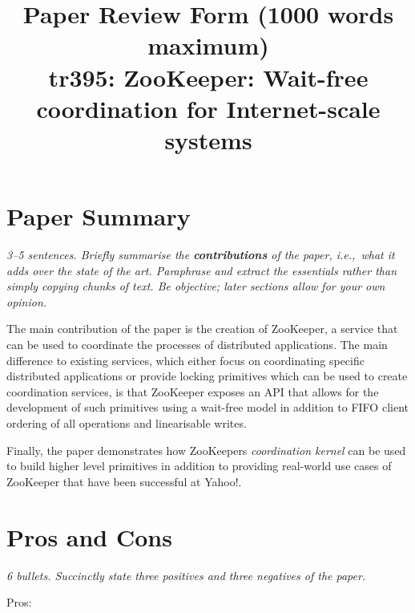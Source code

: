 \documentclass[11pt]{article}
\begin{document}

\title{Paper Review Form (1000 words maximum)\\
    tr395: ZooKeeper: Wait-free coordination for Internet-scale systems \cite{ZooKeeper}}

\maketitle

\section*{Paper Summary}

\textsl{3--5 sentences. Briefly summarise the {\bf contributions} of the paper,
i.e.,~what it adds over the state of the art. Paraphrase and extract the
essentials rather than simply copying chunks of text. Be objective; later
sections allow for your own opinion.}

The main contribution of the paper is the creation of ZooKeeper, a service that
can be used to coordinate the processes of distributed applications. The main
difference to existing services, which either focus on coordinating specific
distributed applications or provide locking primitives which can be used to
create coordination services, is that ZooKeeper exposes an API that allows for
the development of such primitives using a wait-free model in addition to FIFO
client ordering of all operations and linearisable writes.

Finally, the paper demonstrates how ZooKeepers \textit{coordination kernel} can
be used to build higher level primitives in addition to providing real-world
use cases of ZooKeeper that have been successful at Yahoo!.

\section*{Pros and Cons}

\textsl{6 bullets. Succinctly state three positives and three negatives of the
paper.}

Pros:
\end{document}
